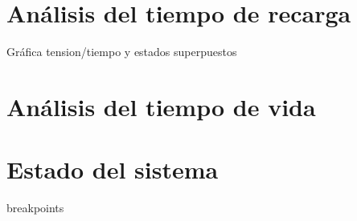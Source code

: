 \section{Análisis del tiempo de recarga}
\label{sec:recarga}
Gráfica tension/tiempo y estados superpuestos

\section{Análisis del tiempo de vida}
\label{sec:vida}
\section{Estado del sistema}
\label{sec:estado}
breakpoints


